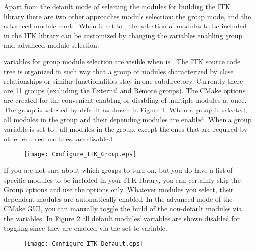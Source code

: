 Apart from the default mode of selecting the modules for building the ITK
library there are two other approaches module selection: the group mode, and the
advanced module mode. When  is set to
, the selection of modules to be included in the ITK library can be
customized by changing the variables enabling group and advanced module
selection.

 variables for group module selection are visible
when  is . The ITK source code tree
is organized in such way that a group of modules characterized by close
relationships or similar functionalities stay in one subdirectory. Currently
there are 11 groups (excluding the External and Remote groups). The CMake
 options are created for the convenient enabling
or disabling of multiple modules at once. The  group is
selected by default as shown in Figure \ref{fig:ConfigITKGroup}. When a group is
selected, all modules in the group and their depending modules are enabled. When
a group variable is set to , all modules in the group, except the ones
that are required by other enabled modules, are disabled.

\begin{figure}[htb!]
\centering
\texttt{[image: Configure\_ITK\_Group.eps]}
\label{fig:ConfigITKGroup}
\end{figure}

If you are not sure about which groups to turn on, but you do have a list of
specific modules to be included in your ITK library, you can certainly skip the
Group options and use the  options only. Whatever
modules you select, their dependent modules are automatically enabled. In the
advanced mode of the CMake GUI, you can manually toggle the build of the
non-default modules via the  variables. In Figure
\ref{fig:ConfigITKDefault} all default modules' 
variables are shown disabled for toggling since they are enabled via the
 set to  variable.

\begin{figure}[htb!]
\centering
\texttt{[image: Configure\_ITK\_Default.eps]}
\label{fig:ConfigITKDefault}
\end{figure}

